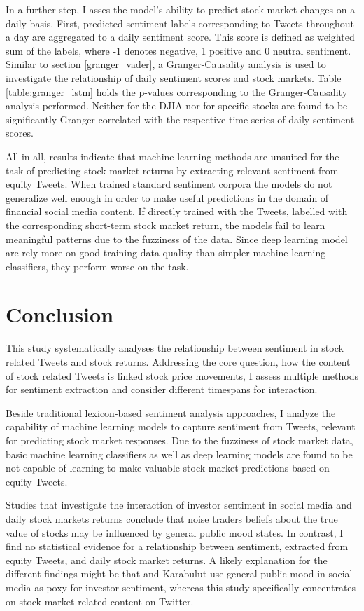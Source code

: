 \documentclass[a4paper,12pt]{article}%
\begin{document}
In a further step, I asses the model's ability to predict stock market changes on a daily basis. First, predicted sentiment labels corresponding to Tweets throughout a day are aggregated to a daily sentiment score. This score is defined as weighted sum of the labels, where -1 denotes negative, 1 positive and 0 neutral sentiment. Similar to section \ref{granger_vader}, a Granger-Causality analysis is used to investigate the relationship of daily sentiment scores and stock markets. Table \ref{table:granger_lstm} holds the p-values corresponding to the Granger-Causality analysis performed. Neither for the DJIA nor for specific stocks are found to be significantly Granger-correlated with the respective time series of daily sentiment scores.

All in all, results indicate that machine learning methods are unsuited for the task of predicting stock market returns by extracting relevant sentiment from equity Tweets. When trained standard sentiment corpora the models do not generalize well enough in order to make useful predictions in the domain of financial social media content. If directly trained with the Tweets, labelled with the corresponding short-term stock market return, the models fail to learn meaningful patterns due to the fuzziness of the data. Since deep learning model are rely more on good training data quality than simpler machine learning classifiers, they perform worse on the task.


\section{Conclusion \label{conclusion}}
This study systematically analyses the relationship between sentiment in stock related Tweets and stock returns. Addressing the core question, how the content of stock related Tweets is linked stock price movements, I assess multiple methods for sentiment extraction and consider different timespans for interaction. 

Beside traditional lexicon-based sentiment analysis approaches, I analyze the capability of machine learning models to capture sentiment from Tweets, relevant for predicting stock market responses. Due to the fuzziness of stock market data, basic machine learning classifiers as well as deep learning models are found to be not capable of learning to make valuable stock market predictions based on equity Tweets.

Studies that investigate the interaction of investor sentiment in social media and daily stock markets returns \citep{Bollen2011, Karabulut2013} conclude that noise traders beliefs about the true value of stocks may be influenced by general public mood states. 
In contrast, I find no statistical evidence for a relationship between sentiment, extracted from equity Tweets, and daily stock market returns. A likely explanation for the different findings might be that \citeauthor{Bollen2011} and Karabulut use general public mood in social media as poxy for investor sentiment, whereas this study specifically concentrates on stock market related content on Twitter.
\end{document}
